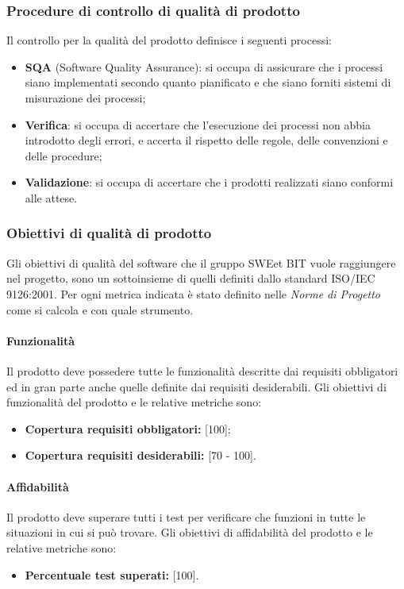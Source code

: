   \subsubsection{Procedure di controllo di qualità di prodotto}
    Il controllo per la qualità del prodotto definisce i seguenti processi:
    \begin{itemize}
      \item \textbf{SQA} (Software Quality Assurance): si occupa di assicurare
      che i processi siano implementati secondo quanto pianificato e che siano
      forniti sistemi di misurazione dei processi;
      \item \textbf{Verifica}: si occupa di accertare che l'esecuzione dei
      processi non abbia introdotto degli errori, e accerta il rispetto delle
      regole, delle convenzioni e delle procedure;
      \item \textbf{Validazione}: si occupa di accertare che i prodotti
      realizzati siano conformi alle attese.
    \end{itemize}

\subsubsection{Obiettivi di qualità di prodotto}  
Gli obiettivi di qualità del software che il gruppo SWEet BIT vuole raggiungere nel progetto, sono un sottoinsieme di quelli definiti dallo standard ISO/IEC 9126:2001.
Per ogni metrica indicata è stato definito nelle \emph{Norme di Progetto} \VersioneNP{} come si calcola e con quale strumento.

\paragraph{Funzionalità} Il prodotto deve possedere tutte le funzionalità descritte dai requisiti obbligatori ed in gran parte anche quelle definite dai requisiti desiderabili. Gli obiettivi di funzionalità del prodotto e le relative metriche sono:
\begin{itemize}
\item \textbf{Copertura requisiti obbligatori: }[100];
\item \textbf{Copertura requisiti desiderabili: }[70 - 100].
\end{itemize}

\paragraph{Affidabilità} Il prodotto deve superare tutti i test per verificare che funzioni in tutte le situazioni in cui si può trovare.
Gli obiettivi di affidabilità del prodotto e le relative metriche sono:
\begin{itemize}
\item \textbf{Percentuale test superati: }[100].
\end{itemize}

